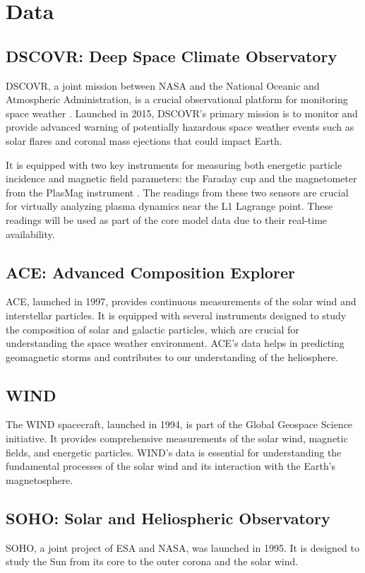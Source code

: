 \documentclass[12pt]{article}
\begin{document}
\section{Data}

\subsection{DSCOVR: Deep Space Climate Observatory}
DSCOVR, a joint mission between NASA and the National Oceanic and Atmospheric Administration, is a crucial observational platform for monitoring space weather \cite{nasa_dscovr}. Launched in 2015, DSCOVR's primary mission is to monitor and provide advanced warning of potentially hazardous space weather events such as solar flares and coronal mass ejections that could impact Earth.

It is equipped with two key instruments for measuring both energetic particle incidence and magnetic field parameters: the Faraday cup and the magnetometer from the PlasMag instrument \cite{nasa_dscovr}. The readings from these two sensors are crucial for virtually analyzing plasma dynamics near the L1 Lagrange point. These readings will be used as part of the core model data due to their real-time availability.

\subsection{ACE: Advanced Composition Explorer}
ACE, launched in 1997, provides continuous measurements of the solar wind and interstellar particles. It is equipped with several instruments designed to study the composition of solar and galactic particles, which are crucial for understanding the space weather environment. ACE's data helps in predicting geomagnetic storms and contributes to our understanding of the heliosphere.

\subsection{WIND}
The WIND spacecraft, launched in 1994, is part of the Global Geospace Science initiative. It provides comprehensive measurements of the solar wind, magnetic fields, and energetic particles. WIND's data is essential for understanding the fundamental processes of the solar wind and its interaction with the Earth's magnetosphere.

\subsection{SOHO: Solar and Heliospheric Observatory}
SOHO, a joint project of ESA and NASA, was launched in 1995. It is designed to study the Sun from its core to the outer corona and the solar wind.
\end{document}
